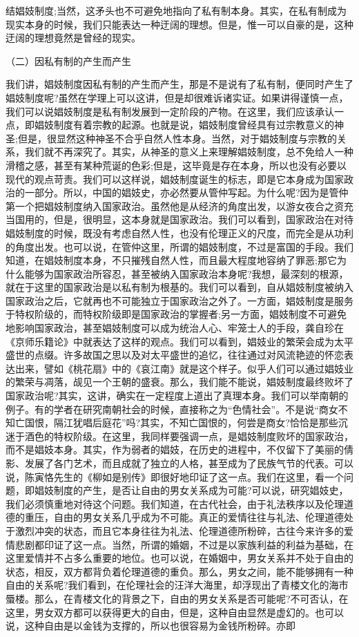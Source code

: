 \documentclass[a4paper]{article}
\begin{document}
结娼妓制度;当然，这矛头也不可避免地指向了私有制本身。其实，在私有制成为现实本身的时候，我们只能表达一种迂阔的理想。但是，惟一可以自豪的是，这种迂阔的理想竟然是曾经的现实。

（二）因私有制的产生而产生

我们讲，娼妓制度因私有制的产生而产生，那是不是说有了私有制，便同时产生了娼妓制度呢?虽然在学理上可以这讲，但是却很难诉诸实证。如果讲得谨慎一点，我们可以说娼妓制度是私有制发展到一定阶段的产物。在这里，我们应该承认一点，即娼妓制度有着宗教的起源。也就是说，娼妓制度曾经具有过宗教意义的神圣;但是，很显然这种神圣不合乎自然人性本身。当然，对于娼妓制度与宗教的关系，我们就不再深究了。其实，从神圣的意义上来理解娼妓制度，总不免给人一种滑稽之感，甚至有某种荒诞的色彩;但是，这毕竟是存在本身，所以也没有必要以现代的观点苛责。我们可以这样说，娼妓制度诞生的标志，即是它本身成为国家政治的一部分。所以，中国的娼妓史，亦必然要从管仲写起。为什么呢?因为是管仲第一个把娼妓制度纳入国家政治。虽然他是从经济的角度出发，以游女夜合之资充当国用的，但是，很明显，这本身就是国家政治。我们可以看到，国家政治在对待娼妓制度的时候，既没有考虑自然人性，也没有伦理正义的尺度，而完全是从功利的角度出发。也可以说，在管仲这里，所谓的娼妓制度，不过是富国的手段。我们知道，在娼妓制度本身，不只摧残自然人性，而且最大程度地容纳了罪恶;那它为什么能够为国家政治所容忍，甚至被纳入国家政治本身呢?我想，最深刻的根源，就在于这里的国家政治是以私有制为根基的。我们可以看到，自从娼妓制度被纳入国家政治之后，它就再也不可能独立于国家政治之外了。一方面，娼妓制度是服务于特权阶级的，而特权阶级即是国家政治的掌握者;另一方面，娼妓制度不可避免地影响国家政治，甚至娼妓制度可以成为统治人心、牢笼士人的手段，龚自珍在《京师乐籍论》中就表达了这样的观点。我们可以看到，娼妓业的繁荣会成为太平盛世的点缀。许多故国之思以及对太平盛世的追忆，往往通过对风流艳迹的怀恋表达出来，譬如《桃花扇》中的《哀江南》就是这个样子。似乎人们可以通过娼妓业的繁荣与凋落，觇见一个王朝的盛衰。那么，我们能不能说，娼妓制度最终败坏了国家政治呢?其实，这讲，确实在一定程度上道出了真理本身。我们可以举南朝的例子。有的学者在研究南朝社会的时候，直接称之为“色情社会”。不是说“商女不知亡国恨，隔江犹唱后庭花”吗?其实，不知亡国恨的，何尝是商女?恰恰是那些沉迷于酒色的特权阶级。在这里，我同样要强调一点，是娼妓制度败坏的国家政治，而不是娼妓本身。其实，作为弱者的娼妓，在历史的进程中，不仅留下了美丽的倩影、发展了各门艺术，而且成就了独立的人格，甚至成为了民族气节的代表。可以说，陈寅恪先生的《柳如是别传》即很好地印证了这一点。我们在这里，看一个问题，即娼妓制度的产生，是否让自由的男女关系成为可能?可以说，研究娼妓史，我们必须慎重地对待这个问题。我们知道，在古代社会，由于礼法秩序以及伦理道德的重压，自由的男女关系几乎成为不可能。真正的爱情往往与礼法、伦理道德处于激烈冲突的状态，而且它本身往往为礼法、伦理道德所粉碎，古往今来许多的爱情悲剧都印证了这一点。当然，所谓的婚姻，不过是以家族利益的利益为基础，在这里爱情并不占多么重要的地位。也可以说，在婚姻中，男女关系并不处于自由的状态，相反，双方都背负着伦理道德的重负。那么，男女之间，能不能够拥有一种自由的关系呢?我们看到，在伦理社会的汪洋大海里，却浮现出了青楼文化的海市蜃楼。那么，在青楼文化的背景之下，自由的男女关系是否可能呢?不可否认，在这里，男女双方都可以获得更大的自由，但是，这种自由显然是虚幻的。也可以说，这种自由是以金钱为支撑的，所以也很容易为金钱所粉碎。亦即
\end{document}
